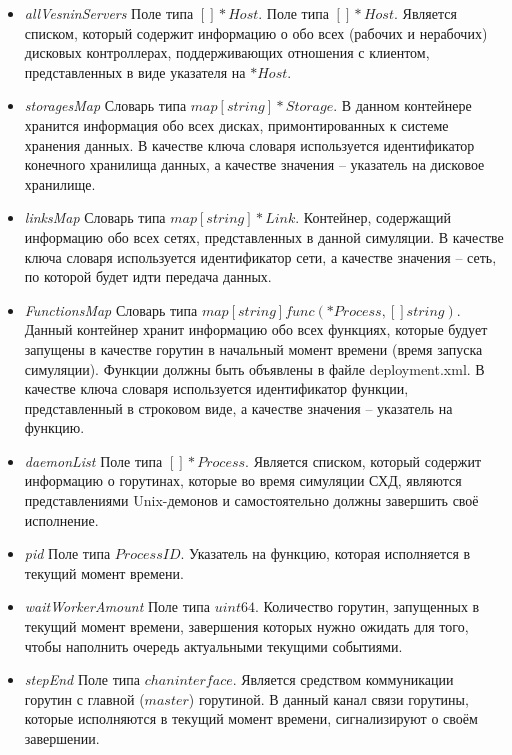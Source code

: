 \begin{itemize}
\item \textit{allVesninServers}
Поле типа $[]*Host$. Поле типа $[]*Host$. Является списком, который содержит информацию о обо всех (рабочих и нерабочих) дисковых контроллерах, поддерживающих отношения с клиентом, представленных в виде указателя на $*Host$.

\item \textit{storagesMap}   
Словарь типа $map[string]*Storage$. В данном контейнере хранится информация обо всех дисках, примонтированных к системе хранения данных. В качестве ключа словаря используется идентификатор конечного хранилища данных, а качестве значения -- указатель на дисковое хранилище.

\item \textit{linksMap}      
Словарь типа $map[string]*Link$. Контейнер, содержащий информацию обо всех сетях, представленных в данной симуляции.  В качестве ключа словаря используется идентификатор сети, а качестве значения -- сеть, по которой будет идти передача данных.

\item \textit{FunctionsMap} 
Словарь типа $map[string]func(*Process, []string)$. Данный контейнер хранит информацию обо всех функциях, которые будует запущены в качестве горутин в начальный момент времени (время запуска симуляции). Функции должны быть объявлены в файле deployment.xml.  В качестве ключа словаря используется идентификатор функции, представленный в строковом виде, а качестве значения -- указатель на функцию.

\item \textit{daemonList}  
Поле типа $[]*Process$. Является списком, который содержит информацию о горутинах, которые во время симуляции СХД, являются представлениями Unix-демонов и самостоятельно должны завершить своё исполнение.

\item \textit{pid} 
Поле типа $ProcessID$. Указатель на функцию, которая исполняется в текущий момент времени.

\item \textit{waitWorkerAmount} 
Поле типа $uint64$. Количество горутин, запущенных в текущий момент времени, завершения которых нужно ожидать для того, чтобы наполнить очередь актуальными текущими событиями. 

\item \textit{stepEnd}        
Поле типа $chan interface{}$. Является средством коммуникации горутин с главной ($master$) горутиной. В данный канал связи горутины, которые исполняются в текущий момент времени, сигнализируют о своём завершении.


\end{itemize}
